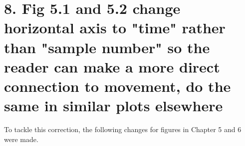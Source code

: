 \documentclass[12pt]{article}
\begin{document}
\begin{enumerate}
%
%	
%
%
%	
%
%



\end{enumerate}














\section*{8. 
Fig 5.1 and 5.2 change horizontal axis to
"time" rather than "sample number" so the reader
can make a more direct connection to movement,
do the same in similar plots elsewhere
}

To tackle this correction, the following changes
for figures in Chapter 5 and 6 were made.
\end{document}
